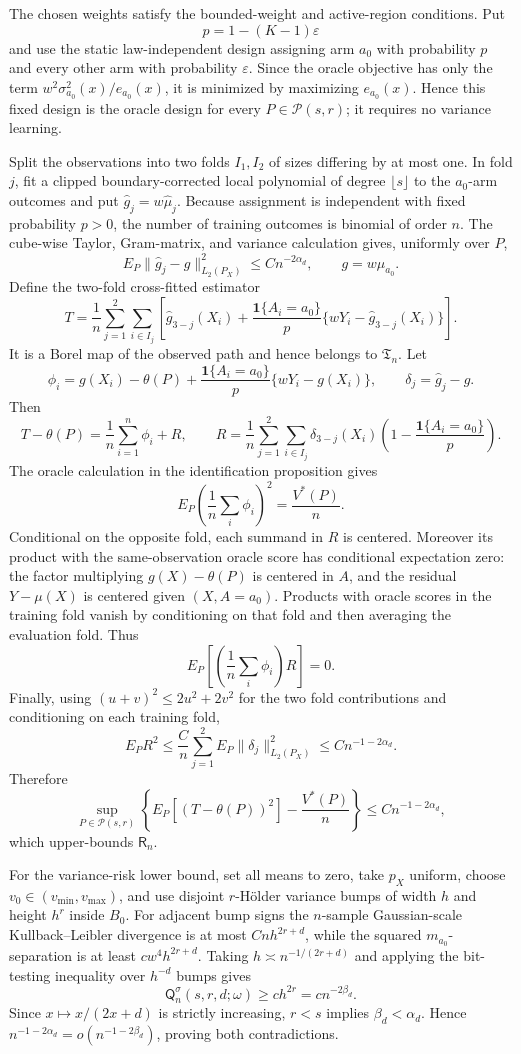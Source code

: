 The chosen weights satisfy the bounded-weight and active-region conditions.  Put
\[
p=1-(K-1)\varepsilon
\]
and use the static law-independent design assigning arm \(a_0\) with probability \(p\) and every other arm with probability \(\varepsilon\).  Since the oracle objective has only the term \(w^2\sigma_{a_0}^2(x)/e_{a_0}(x)\), it is minimized by maximizing \(e_{a_0}(x)\).  Hence this fixed design is the oracle design for every \(P\in\mathcal P(s,r)\); it requires no variance learning.

Split the observations into two folds \(I_1,I_2\) of sizes differing by at most one.  In fold \(j\), fit a clipped boundary-corrected local polynomial of degree \(\lfloor s\rfloor\) to the \(a_0\)-arm outcomes and put \(\widehat g_j=w\widehat\mu_j\).  Because assignment is independent with fixed probability \(p>0\), the number of training outcomes is binomial of order \(n\).  The cube-wise Taylor, Gram-matrix, and variance calculation gives, uniformly over \(P\),
\[
E_P\|\widehat g_j-g\|_{L_2(P_X)}^2\leq Cn^{-2\alpha_d},
\qquad g=w\mu_{a_0}.
\]
Define the two-fold cross-fitted estimator
\[
T=\frac1n\sum_{j=1}^2\sum_{i\in I_j}
\left[
\widehat g_{3-j}(X_i)
+\frac{\mathbf 1\{A_i=a_0\}}p\{wY_i-\widehat g_{3-j}(X_i)\}
\right].
\]
It is a Borel map of the observed path and hence belongs to \(\mathfrak T_n\).  Let
\[
\phi_i=g(X_i)-\theta(P)
+\frac{\mathbf 1\{A_i=a_0\}}p\{wY_i-g(X_i)\},
\qquad
\delta_j=\widehat g_j-g.
\]
Then
\[
T-\theta(P)=\frac1n\sum_{i=1}^n\phi_i+R,
\qquad
R=\frac1n\sum_{j=1}^2\sum_{i\in I_j}
\delta_{3-j}(X_i)\left(1-\frac{\mathbf 1\{A_i=a_0\}}p\right).
\]
The oracle calculation in the identification proposition gives
\[
E_P\left(\frac1n\sum_i\phi_i\right)^2=\frac{V^*(P)}n.
\]
Conditional on the opposite fold, each summand in \(R\) is centered.  Moreover its product with the same-observation oracle score has conditional expectation zero: the factor multiplying \(g(X)-\theta(P)\) is centered in \(A\), and the residual \(Y-\mu(X)\) is centered given \((X,A=a_0)\).  Products with oracle scores in the training fold vanish by conditioning on that fold and then averaging the evaluation fold.  Thus
\[
E_P\left[\left(\frac1n\sum_i\phi_i\right)R\right]=0.
\]
Finally, using \((u+v)^2\leq2u^2+2v^2\) for the two fold contributions and conditioning on each training fold,
\[
E_PR^2
\leq\frac{C}{n}\sum_{j=1}^2E_P\|\delta_j\|_{L_2(P_X)}^2
\leq Cn^{-1-2\alpha_d}.
\]
Therefore
\[
\sup_{P\in\mathcal P(s,r)}
\left\{E_P[(T-\theta(P))^2]-\frac{V^*(P)}n\right\}
\leq Cn^{-1-2\alpha_d},
\]
which upper-bounds \(\mathsf R_n\).

For the variance-risk lower bound, set all means to zero, take \(p_X\) uniform, choose \(v_0\in(v_{\min},v_{\max})\), and use disjoint \(r\)-Hölder variance bumps of width \(h\) and height \(h^r\) inside \(B_0\).  For adjacent bump signs the \(n\)-sample Gaussian-scale Kullback--Leibler divergence is at most \(Cnh^{2r+d}\), while the squared \(m_{a_0}\)-separation is at least \(cw^4h^{2r+d}\).  Taking \(h\asymp n^{-1/(2r+d)}\) and applying the bit-testing inequality over \(h^{-d}\) bumps gives
\[
\mathsf Q_n^{\sigma}(s,r,d;\omega)\geq ch^{2r}=cn^{-2\beta_d}.
\]
Since \(x\mapsto x/(2x+d)\) is strictly increasing, \(r<s\) implies \(\beta_d<\alpha_d\).  Hence \(n^{-1-2\alpha_d}=o(n^{-1-2\beta_d})\), proving both contradictions.